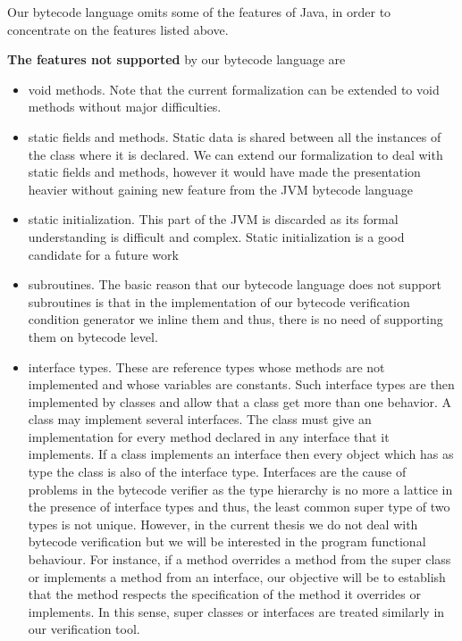 

 Our bytecode language omits some of the features of Java, in order to concentrate on the features listed above.

\textbf{The features not supported} by our bytecode language are 
\begin{itemize} 
   \item void methods. Note that the current formalization can be extended to void methods without major difficulties.

   \item static fields and methods. Static data is shared between all the instances of the class
         where it is declared.  We can extend our formalization to deal with static fields and methods,
	 however it would have made the presentation heavier without gaining new feature from the JVM bytecode language  

   \item static initialization. This part of the JVM is discarded as its formal understanding is difficult and complex.
         Static initialization is a good candidate for a future work 

   \item subroutines. The basic reason that our bytecode language does not support subroutines is that 
         in the implementation of our bytecode verification condition generator we inline them and thus, there is no need
	 of supporting them on bytecode level.

   \item interface types. These are reference types whose methods are not implemented and whose variables are constants.
         Such interface types are then implemented by classes and allow that a class get more than one behavior.
	 A class may implement several interfaces. 
	 The class must give an implementation for every method declared in any interface that it implements.
	 If a class implements an interface then every object which has as type the class is also of the interface type.
	 Interfaces  are the cause of  problems in the bytecode verifier as the type hierarchy is no more a lattice in the 
	 presence of interface types and thus,
	 the least common super type of two types is not unique.
	 However, in the current thesis we do not deal with bytecode verification but 
	 we will be interested in the program functional behaviour. For instance, if a method overrides a method
	 from the super class or implements a method from an interface, our objective will be to establish that the method
	 respects the specification of the method it overrides or implements. In this sense, super classes or interfaces
	 are treated similarly in our verification tool.
  

\end{itemize}
